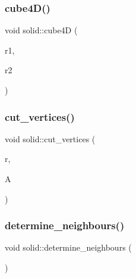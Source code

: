 \mbox{\label{classsolid_ab6c85f8f130a3f4409ce5fe5340fb852}} 
\subsubsection{\texorpdfstring{cube4\+D()}{cube4D()}}
{\footnotesize\ttfamily void solid\+::cube4D (\begin{DoxyParamCaption}\item[{\mbox{\hyperlink{galois_8h_a09fddde158a3a20bd2dcadb609de11dc}{I\+NT}}}]{r1,  }\item[{\mbox{\hyperlink{galois_8h_a09fddde158a3a20bd2dcadb609de11dc}{I\+NT}}}]{r2 }\end{DoxyParamCaption})}

\mbox{\label{classsolid_a286d7bb090878dfbdc2fcd0dcf4739ce}} 
\subsubsection{\texorpdfstring{cut\+\_\+vertices()}{cut\_vertices()}}
{\footnotesize\ttfamily void solid\+::cut\+\_\+vertices (\begin{DoxyParamCaption}\item[{double}]{r,  }\item[{\mbox{\hyperlink{classsolid}{solid}} \&}]{A }\end{DoxyParamCaption})}

\mbox{\label{classsolid_ad6bcabc7a3e9082b4baef371e7828c27}} 
\subsubsection{\texorpdfstring{determine\+\_\+neighbours()}{determine\_neighbours()}}
{\footnotesize\ttfamily void solid\+::determine\+\_\+neighbours (\begin{DoxyParamCaption}{ }\end{DoxyParamCaption})}

\mbox{\label{classsolid_a8b4527c066bcebd2e6542fe158c607b0}} 
